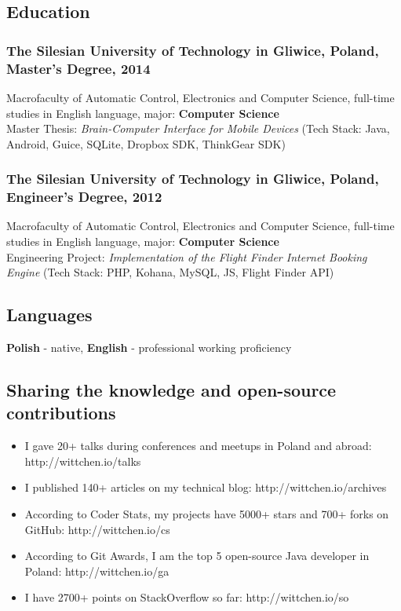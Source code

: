 \documentclass[8pt]{extarticle}
\begin{document}
    \subsection*{\normalsize{Education}}

      \subsubsection*{\normalsize{The Silesian University of Technology in Gliwice, Poland, Master's Degree, 2014}}
      Macrofaculty of Automatic Control, Electronics and Computer Science,
      full-time studies in English language, major: \textbf{Computer Science}\\
      Master Thesis: \textit{Brain-Computer Interface for Mobile Devices}
      (Tech Stack: Java, Android, Guice, SQLite, Dropbox SDK, ThinkGear SDK)

      \subsubsection*{\normalsize{The Silesian University of Technology in Gliwice, Poland, Engineer's Degree, 2012}}
      Macrofaculty of Automatic Control, Electronics and Computer Science,
      full-time studies in English language, major: \textbf{Computer Science}\\
      Engineering Project: \textit{Implementation of the Flight Finder Internet Booking Engine}
      (Tech Stack: PHP, Kohana, MySQL, JS, Flight Finder API)

    \subsection*{\normalsize{Languages}}
    \textbf{Polish} - native, \textbf{English} - professional working proficiency

    \subsection*{\normalsize{Sharing the knowledge and open-source contributions}}
    \begin{itemize}
      \item I gave 20+ talks during conferences and meetups in Poland and abroad: http://wittchen.io/talks
      \item I published 140+ articles on my technical blog: http://wittchen.io/archives
      \item According to Coder Stats, my projects have 5000+ stars and 700+ forks on GitHub: http://wittchen.io/cs
      \item According to Git Awards, I am the top 5 open-source Java developer in Poland: http://wittchen.io/ga
      \item I have 2700+ points on StackOverflow so far: http://wittchen.io/so
    \end{itemize}
\end{document}
